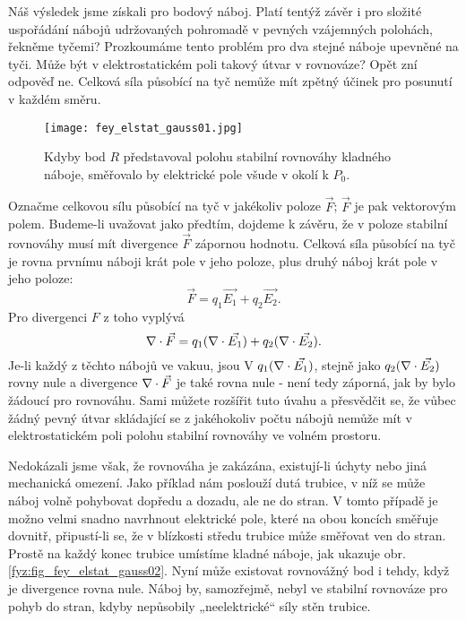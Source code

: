       Náš výsledek jsme získali pro bodový náboj. Platí tentýž závěr i pro složité uspořádání nábojů 
      udržovaných pohromadě v pevných vzájemných polohách, řekněme tyčemi? Prozkoumáme tento problém pro dva 
      stejné náboje upevněné na tyči. Může být v elektrostatickém poli takový útvar v rovnováze? Opět zní 
      odpověď ne. Celková síla působící na tyč nemůže mít zpětný účinek pro posunutí v každém směru.
      \begin{wrapfigure}{r}{0.5\linewidth} %
        \centering
        \texttt{[image: fey\_elstat\_gauss01.jpg]}
        \caption{Kdyby bod \(R\) představoval polohu stabilní rovnováhy kladného náboje, směřovalo by   
                 elektrické pole všude v okolí k \(P_0\).}
        \label{fyz:fig_fey_elstat_gauss01}
      \end{wrapfigure} 
      
      Označme celkovou sílu působící na tyč v jakékoliv poloze \(\vec{F}\); \(\vec{F}\) je pak vektorovým	
      polem. Budeme-li uvažovat jako předtím, dojdeme k závěru, že v poloze stabilní rovnováhy musí mít
      divergence \(\vec{F}\) zápornou hodnotu. Celková síla působící na tyč je rovna prvnímu náboji krát pole 
      v jeho poloze, plus druhý náboj krát pole v jeho poloze: 
      \begin{equation}\label{fyz:eq_fey_elstat_gauss01}
       \vec{F}=q_1\vec{E_1} + q_2\vec{E_2}. 
      \end{equation}
      Pro divergenci \(F\) z toho vyplývá \[\nabla\cdot\vec{F}=q_1(\nabla\cdot\vec{E_1}) + q_2(\nabla\cdot\vec{E_2}).\] Je-li každý z 
      těchto nábojů ve vakuu, jsou V \(q_1(\nabla\cdot\vec{E_1})\), stejně jako \(q_2(\nabla\cdot\vec{E_2})\) rovny nule a 
      divergence \(\nabla\cdot\vec{F}\) je také rovna nule - není tedy záporná, jak by bylo žádoucí pro rovnováhu. 
      Sami můžete rozšířit tuto úvahu a přesvědčit se, že vůbec žádný pevný útvar skládající se z jakéhokoliv 
      počtu nábojů nemůže mít v elektrostatickém poli polohu stabilní rovnováhy ve volném prostoru.
      
      Nedokázali jsme však, že rovnováha je zakázána, existují-li úchyty nebo jiná mechanická omezení. Jako 
      příklad nám poslouží dutá trubice, v níž se může náboj volně pohybovat dopředu a dozadu, ale ne do 
      stran. V tomto případě je možno velmi snadno navrhnout elektrické pole, které na obou koncích směřuje 
      dovnitř, připustí-li se, že v blízkosti středu trubice může směřovat ven do stran. Prostě na každý 
      konec trubice umístíme kladné náboje, jak ukazuje obr. \ref{fyz:fig_fey_elstat_gauss02}. Nyní může 
      existovat rovnovážný bod i tehdy, když je divergence rovna nule. Náboj by, samozřejmě, nebyl ve 
      stabilní rovnováze pro pohyb do stran, kdyby nepůsobily „neelektrické“ síly stěn trubice. 
      
